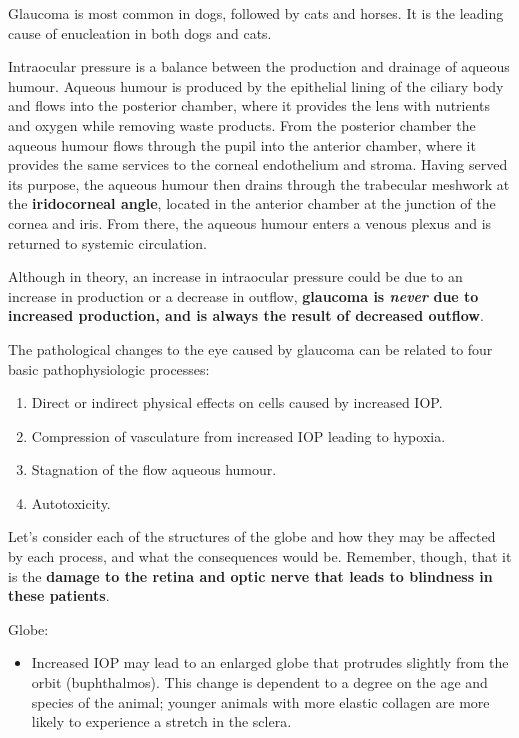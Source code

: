 \documentclass[openany]{article}
\providecommand{\tightlist}{%
  \setlength{\itemsep}{0pt}\setlength{\parskip}{0pt}}
\begin{document}
Glaucoma is most common in dogs, followed by cats and horses. It is the
leading cause of enucleation in both dogs and cats.

Intraocular pressure is a balance between the production and drainage of
aqueous humour. Aqueous humour is produced by the epithelial lining of
the ciliary body and flows into the posterior chamber, where it provides
the lens with nutrients and oxygen while removing waste products. From
the posterior chamber the aqueous humour flows through the pupil into
the anterior chamber, where it provides the same services to the corneal
endothelium and stroma. Having served its purpose, the aqueous humour
then drains through the trabecular meshwork at the \textbf{iridocorneal
angle}, located in the anterior chamber at the junction of the cornea
and iris. From there, the aqueous humour enters a venous plexus and is
returned to systemic circulation.

Although in theory, an increase in intraocular pressure could be due to
an increase in production or a decrease in outflow, \textbf{glaucoma is
\emph{never} due to increased production, and is always the result of
decreased outflow}.

The pathological changes to the eye caused by glaucoma can be related to
four basic pathophysiologic processes:

\begin{enumerate}
\def\labelenumi{\arabic{enumi}.}
\tightlist
\item
  Direct or indirect physical effects on cells caused by increased IOP.
\item
  Compression of vasculature from increased IOP leading to hypoxia.
\item
  Stagnation of the flow aqueous humour.
\item
  Autotoxicity.
\end{enumerate}

Let's consider each of the structures of the globe and how they may be
affected by each process, and what the consequences would be. Remember,
though, that it is the \textbf{damage to the retina and optic nerve that
leads to blindness in these patients}.

Globe:

\begin{itemize}
\tightlist
\item
  Increased IOP may lead to an enlarged globe that protrudes slightly
  from the orbit (buphthalmos). This change is dependent to a degree on
  the age and species of the animal; younger animals with more elastic
  collagen are more likely to experience a stretch in the sclera.
\end{itemize}
\end{document}
